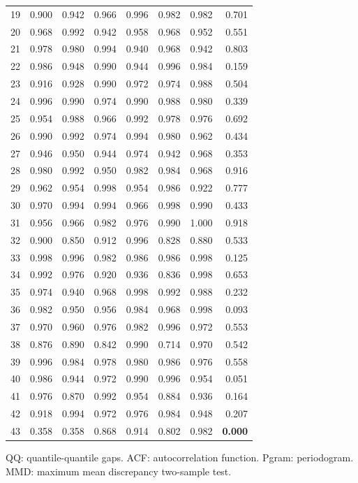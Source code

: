 \documentclass[11pt,a4paper]{article}
\begin{document}
\begin{center}
\begin{tabular}{lrrrrrrr}
19 & 0.900 & 0.942 & 0.966 & 0.996 & 0.982 & 0.982 & 0.701 \\
20 & 0.968 & 0.992 & 0.942 & 0.958 & 0.968 & 0.952 & 0.551 \\
21 & 0.978 & 0.980 & 0.994 & 0.940 & 0.968 & 0.942 & 0.803 \\
22 & 0.986 & 0.948 & 0.990 & 0.944 & 0.996 & 0.984 & 0.159 \\
23 & 0.916 & 0.928 & 0.990 & 0.972 & 0.974 & 0.988 & 0.504 \\
24 & 0.996 & 0.990 & 0.974 & 0.990 & 0.988 & 0.980 & 0.339 \\
25 & 0.954 & 0.988 & 0.966 & 0.992 & 0.978 & 0.976 & 0.692 \\
26 & 0.990 & 0.992 & 0.974 & 0.994 & 0.980 & 0.962 & 0.434 \\
27 & 0.946 & 0.950 & 0.944 & 0.974 & 0.942 & 0.968 & 0.353 \\
28 & 0.980 & 0.992 & 0.950 & 0.982 & 0.984 & 0.968 & 0.916 \\
29 & 0.962 & 0.954 & 0.998 & 0.954 & 0.986 & 0.922 & 0.777 \\
30 & 0.970 & 0.994 & 0.994 & 0.966 & 0.998 & 0.990 & 0.433 \\
31 & 0.956 & 0.966 & 0.982 & 0.976 & 0.990 & 1.000 & 0.918 \\
32 & 0.900 & 0.850 & 0.912 & 0.996 & 0.828 & 0.880 & 0.533 \\
33 & 0.998 & 0.996 & 0.982 & 0.986 & 0.986 & 0.998 & 0.125 \\
34 & 0.992 & 0.976 & 0.920 & 0.936 & 0.836 & 0.998 & 0.653 \\
35 & 0.974 & 0.940 & 0.968 & 0.998 & 0.992 & 0.988 & 0.232 \\
36 & 0.982 & 0.950 & 0.956 & 0.984 & 0.968 & 0.998 & 0.093 \\
37 & 0.970 & 0.960 & 0.976 & 0.982 & 0.996 & 0.972 & 0.553 \\
38 & 0.876 & 0.890 & 0.842 & 0.990 & 0.714 & 0.970 & 0.542 \\
39 & 0.996 & 0.984 & 0.978 & 0.980 & 0.986 & 0.976 & 0.558 \\
40 & 0.986 & 0.944 & 0.972 & 0.990 & 0.996 & 0.954 & 0.051 \\
41 & 0.976 & 0.870 & 0.992 & 0.954 & 0.884 & 0.936 & 0.164 \\
42 & 0.918 & 0.994 & 0.972 & 0.976 & 0.984 & 0.948 & 0.207 \\
43 & 0.358 & 0.358 & 0.868 & 0.914 & 0.802 & 0.982 & \textbf{0.000} \\
\bottomrule
\end{tabular}
\end{center}

QQ: quantile-quantile gaps. ACF: autocorrelation function. Pgram: periodogram. MMD: maximum mean discrepancy two-sample test.
\end{document}
